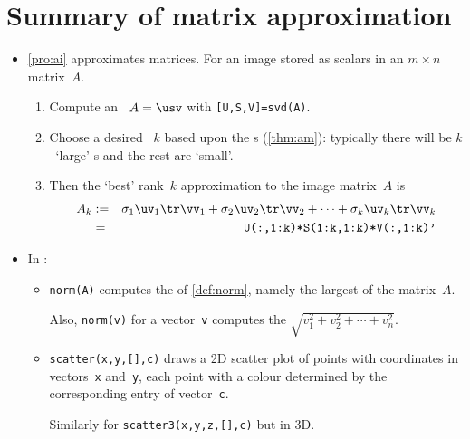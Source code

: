 
\section{Summary of matrix approximation}
\label{sec:summa}

\begin{itemize}
\def\index#1{}%


\subsubsection*{Measure changes to matrices}

\item \autoref{pro:ai} approximates matrices.
For an image stored as scalars in an \(m\times n\) matrix~\(A\).
\begin{enumerate}
\item Compute an \svd\ \(A=\usv\) with \verb|[U,S,V]=svd(A)|.
\item Choose a desired ~\(k\) based upon the s (\autoref{thm:am}): typically there will be \(k\)~`large' s and the rest are `small'.
\item Then the `best' rank~\(k\) approximation to the image matrix~\(A\) is
\begin{eqnarray*}
A_k&:=&\sigma_1\uv_1\tr\vv_1+\sigma_2\uv_2\tr\vv_2+\cdots+\sigma_k\uv_k\tr\vv_k
\\&=&\verb|U(:,1:k)*S(1:k,1:k)*V(:,1:k)'|
\end{eqnarray*}
\end{enumerate}


\item In \script:
\begin{itemize}
\item \index{norm()@\texttt{norm()}}\verb|norm(A)| computes the  of \autoref{def:norm}, namely the largest  of the matrix~\(A\).

Also, \verb|norm(v)| for a vector~\verb|v| computes the  \(\sqrt{v_1^2+v_2^2+\cdots+v_n^2}\).

\item \index{scatter()@\texttt{scatter()}}\verb|scatter(x,y,[],c)| draws a 2D scatter plot of points with coordinates in vectors~\verb|x| and~\verb|y|, each point with a colour determined by the corresponding entry of vector~\verb|c|.  

Similarly for \index{scatter3()@\texttt{scatter3()}}\verb|scatter3(x,y,z,[],c)| but in 3D.


\end{itemize}
\end{itemize}
